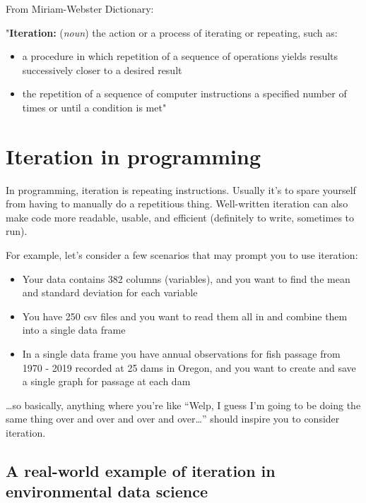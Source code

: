 \documentclass[
]{book}
\providecommand{\tightlist}{%
  \setlength{\itemsep}{0pt}\setlength{\parskip}{0pt}}
\begin{document}
From Miriam-Webster Dictionary:

"\textbf{Iteration:} (\emph{noun}) the action or a process of iterating or repeating, such as:

\begin{itemize}
\tightlist
\item
  a procedure in which repetition of a sequence of operations yields results successively closer to a desired result
\item
  the repetition of a sequence of computer instructions a specified number of times or until a condition is met"
\end{itemize}

\hypertarget{iteration-in-programming}{%
\section{Iteration in programming}\label{iteration-in-programming}}

In programming, iteration is repeating instructions. Usually it's to spare yourself from having to manually do a repetitious thing. Well-written iteration can also make code more readable, usable, and efficient (definitely to write, sometimes to run).

For example, let's consider a few scenarios that may prompt you to use iteration:

\begin{itemize}
\tightlist
\item
  Your data contains 382 columns (variables), and you want to find the mean and standard deviation for each variable
\item
  You have 250 csv files and you want to read them all in and combine them into a single data frame
\item
  In a single data frame you have annual observations for fish passage from 1970 - 2019 recorded at 25 dams in Oregon, and you want to create and save a single graph for passage at each dam
\end{itemize}

\ldots so basically, anything where you're like ``Welp, I guess I'm going to be doing the same thing over and over and over and over\ldots{}'' should inspire you to consider iteration.

\hypertarget{a-real-world-example-of-iteration-in-environmental-data-science}{%
\subsection{A real-world example of iteration in environmental data science}\label{a-real-world-example-of-iteration-in-environmental-data-science}}
\end{document}
